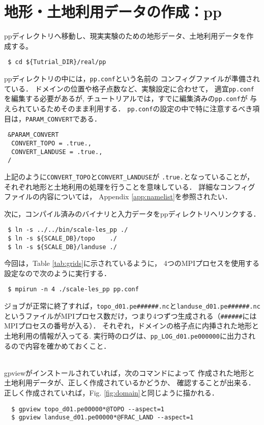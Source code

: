 
\section{地形・土地利用データの作成：pp}

ppディレクトリへ移動し、現実実験のための地形データ、土地利用データを作成する。
\begin{verbatim}
 $ cd ${Tutrial_DIR}/real/pp
\end{verbatim}
ppディレクトリの中には，\verb|pp.conf|という名前の
コンフィグファイルが準備されている．
ドメインの位置や格子点数など、実験設定に合わせて，
適宜\verb|pp.conf|を編集する必要があるが,
チュートリアルでは，すでに編集済みの\verb|pp.conf|が
与えられているためそのまま利用する．
\verb|pp.conf|の設定の中で特に注意するべき項目は，\verb|PARAM_CONVERT|である．
\begin{verbatim}
 &PARAM_CONVERT
  CONVERT_TOPO = .true.,
  CONVERT_LANDUSE = .true.,
 /
\end{verbatim}
上記のように\verb|CONVERT_TOPO|と\verb|CONVERT_LANDUSE|が
\verb|.true.|となっていることが，
それぞれ地形と土地利用の処理を行うことを意味している．
詳細なコンフィグファイルの内容については，
Appendix \ref{app:namelist}を参照されたい．

次に，コンパイル済みのバイナリと入力データをppディレクトリへリンクする．
\begin{verbatim}
 $ ln -s ../../bin/scale-les_pp ./
 $ ln -s ${SCALE_DB}/topo    ./
 $ ln -s ${SCALE_DB}/landuse ./
\end{verbatim}
今回は，Table \ref{tab:grids}に示されているように，
4つのMPIプロセスを使用する設定なので次のように実行する．
\begin{verbatim}
 $ mpirun -n 4 ./scale-les_pp pp.conf
\end{verbatim}
ジョブが正常に終了すれば，\verb|topo_d01.pe######.nc|と\verb|landuse_d01.pe######.nc|というファイルがMPIプロセス数だけ，つまり4つずつ生成される（\verb|######|にはMPIプロセスの番号が入る）．
それぞれ，ドメインの格子点に内挿された地形と土地利用の情報が入ってる.
実行時のログは、\verb|pp_LOG_d01.pe000000|に出力されるので内容を確かめておくこと．



\vspace{1cm}
\\
gpviewがインストールされていれば，次のコマンドによって
作成された地形と土地利用データが、正しく作成されているかどうか、
確認することが出来る．正しく作成されていれば，Fig. \ref{fig:domain}と同じように描かれる．
\begin{verbatim}
  $ gpview topo_d01.pe00000*@TOPO --aspect=1
  $ gpview landuse_d01.pe00000*@FRAC_LAND --aspect=1
\end{verbatim}

